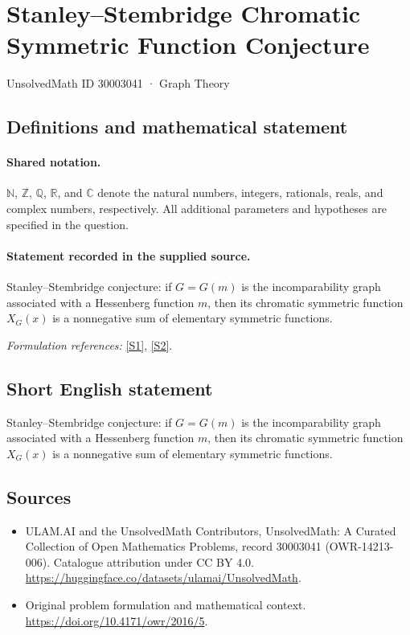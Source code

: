 \documentclass[11pt]{article}
\newcommand{\sref}[2]{\hyperlink{source:#1:#2}{[S#2]}}
\begin{document}
\setcounter{section}{30003040}
\section{Stanley–Stembridge Chromatic Symmetric Function Conjecture}\label{30003041}
{\small UnsolvedMath ID 30003041 · Graph Theory}
\subsection{Definitions and mathematical statement}

\paragraph{Shared notation.}$\mathbb N$, $\mathbb Z$, $\mathbb Q$, $\mathbb R$, and $\mathbb C$ denote the natural numbers, integers, rationals, reals, and complex numbers, respectively. All additional parameters and hypotheses are specified in the question.


\paragraph{Statement recorded in the supplied source.}
Stanley–Stembridge conjecture: if $G=G(m)$ is the incomparability graph associated with a Hessenberg function $m$, then its chromatic symmetric function $X_G(x)$ is a nonnegative sum of elementary symmetric functions.
\par\smallskip\textit{Formulation references:} \sref{30003041}{1}, \sref{30003041}{2}.
\subsection{Short English statement}
Stanley–Stembridge conjecture: if $G=G(m)$ is the incomparability graph associated with a Hessenberg function $m$, then its chromatic symmetric function $X_G(x)$ is a nonnegative sum of elementary symmetric functions.
\subsection{Sources}
\begin{itemize}
\item[\hypertarget{source:30003041:1}{S1}] ULAM.AI and the UnsolvedMath Contributors, UnsolvedMath: A Curated Collection of Open Mathematics Problems, record 30003041 (OWR-14213-006). Catalogue attribution under CC BY 4.0.
\url{https://huggingface.co/datasets/ulamai/UnsolvedMath}.
\item[\hypertarget{source:30003041:2}{S2}] Original problem formulation and mathematical context.
\url{https://doi.org/10.4171/owr/2016/5}.
\end{itemize}
\label{end:30003041}
\end{document}
